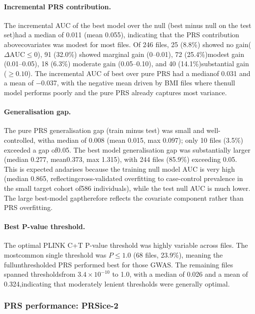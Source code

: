 \documentclass[11pt,a4paper]{article}
\begin{document}
\paragraph{Incremental PRS contribution.}The incremental AUC of the best model over the null (best minus null on the test set)had a median of 0.011 (mean 0.055), indicating that the PRS contribution abovecovariates was modest for most files. Of 246 files, 25 (8.8\%) showed no gain($\Delta\mathrm{AUC} \leq 0$), 91 (32.0\%) showed marginal gain (0--0.01), 72 (25.4\%)modest gain (0.01--0.05), 18 (6.3\%) moderate gain (0.05--0.10), and 40 (14.1\%)substantial gain ($\geq 0.10$). The incremental AUC of best over pure PRS had a medianof 0.031 and a mean of $-$0.037, with the negative mean driven by BMI files where thenull model performs poorly and the pure PRS already captures most variance.

\paragraph{Generalisation gap.}The pure PRS generalisation gap (train minus test) was small and well-controlled, witha median of 0.008 (mean 0.015, max 0.097); only 10 files (3.5\%) exceeded a gap of0.05. The best model generalisation gap was substantially larger (median 0.277, mean0.373, max 1.315), with 244 files (85.9\%) exceeding 0.05. This is expected andarises because the training null model AUC is very high (median 0.865, reflectingcross-validated overfitting to case-control prevalence in the small target cohort of586 individuals), while the test null AUC is much lower. The large best-model gaptherefore reflects the covariate component rather than PRS overfitting.

\paragraph{Best P-value threshold.}The optimal PLINK C+T P-value threshold was highly variable across files. The mostcommon single threshold was $P \leq 1.0$ (68 files, 23.9\%), meaning the fullunthresholded PRS performed best for those GWAS. The remaining files spanned thresholdsfrom $3.4 \times 10^{-10}$ to 1.0, with a median of 0.026 and a mean of 0.324,indicating that moderately lenient thresholds were generally optimal.

\subsubsection{PRS performance: PRSice-2}
\label{sec}
\end{document}
